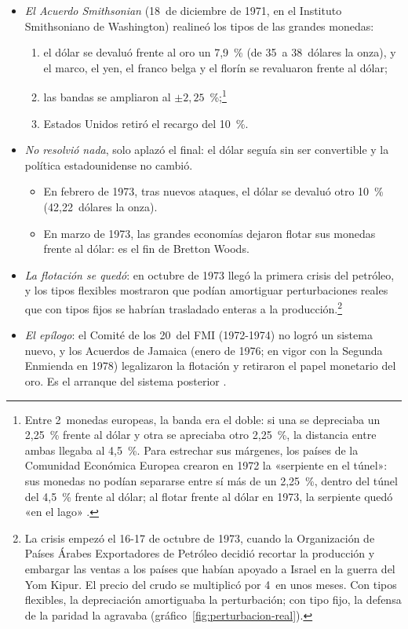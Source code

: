 \documentclass[11pt]{article}
\begin{document}
\begin{itemize}
\item \emph{El Acuerdo Smithsonian} (18~de diciembre de 1971, en el Instituto Smithsoniano de Washington) realineó los tipos de las grandes monedas\nocite{CEA1972ERP}:
  \begin{enumerate}
  \item el dólar se devaluó frente al oro un 7,9~\% (de 35~a 38~dólares la onza), y el marco, el yen, el franco belga y el florín se revaluaron frente al dólar;
  \item las bandas se ampliaron al $\pm2{,}25$~\%;\footnote{Entre 2~monedas europeas, la banda era el doble: si una se depreciaba un 2,25~\% frente al dólar y otra se apreciaba otro 2,25~\%, la distancia entre ambas llegaba al 4,5~\%. Para estrechar sus márgenes, los países de la Comunidad Económica Europea crearon en 1972 la «serpiente en el túnel»: sus monedas no podían separarse entre sí más de un 2,25~\%, dentro del túnel del 4,5~\% frente al dólar; al flotar frente al dólar en 1973, la serpiente quedó «en el lago»  .}
  \item Estados Unidos retiró el recargo del 10~\%.
  \end{enumerate}
\item \emph{No resolvió nada}, solo aplazó el final: el dólar seguía sin ser convertible y la política estadounidense no cambió.
  \begin{itemize}
  \item En febrero de 1973, tras nuevos ataques, el dólar se devaluó otro 10~\% (42,22~dólares la onza).
  \item En marzo de 1973, las grandes economías dejaron flotar sus monedas frente al dólar: es el fin de Bretton Woods.
  \end{itemize}
\item \emph{La flotación se quedó}: en octubre de 1973 llegó la primera crisis del petróleo, y los tipos flexibles mostraron que podían amortiguar perturbaciones reales que con tipos fijos se habrían trasladado enteras a la producción.\footnote{La crisis empezó el 16-17 de octubre de 1973, cuando la Organización de Países Árabes Exportadores de Petróleo decidió recortar la producción y embargar las ventas a los países que habían apoyado a Israel en la guerra del Yom Kipur. El precio del crudo se multiplicó por 4~en unos meses. Con tipos flexibles, la depreciación amortiguaba la perturbación; con tipo fijo, la defensa de la paridad la agravaba (gráfico~\ref{fig:perturbacion-real}).}
\item \emph{El epílogo}: el Comité de los 20~del FMI (1972-1974) no logró un sistema nuevo, y los Acuerdos de Jamaica (enero de 1976; en vigor con la Segunda Enmienda en 1978) legalizaron la flotación y retiraron el papel monetario del oro. Es el arranque del sistema posterior .
\end{itemize}
\end{document}
